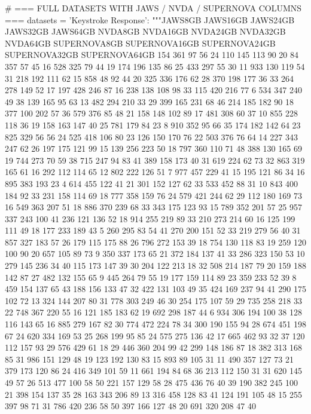 \begin{pyverbatim}
# === FULL DATASETS WITH JAWS / NVDA / SUPERNOVA COLUMNS ===
datasets = {
    'Keystroke Response': """JAWS8GB	JAWS16GB	JAWS24GB	JAWS32GB	JAWS64GB	NVDA8GB	NVDA16GB	NVDA24GB	NVDA32GB	NVDA64GB	SUPERNOVA8GB	SUPERNOVA16GB	SUPERNOVA24GB	SUPERNOVA32GB	SUPERNOVA64GB
154	361	97	56	24	110	145	113	90	20	84	357	57	45	16
528	325	79	44	19	174	196	135	86	25	433	297	55	30	11
933	130	119	54	31	218	192	111	62	15	858	48	92	44	20
325	336	176	62	28	370	198	177	36	33	264	278	149	52	17
197	428	246	87	16	238	138	108	98	33	115	420	216	77	6
534	347	240	49	38	139	165	95	63	13	482	294	210	33	29
399	165	231	68	46	214	185	182	90	18	377	100	202	57	36
579	376	85	48	21	158	148	102	89	17	481	308	60	37	10
855	228	118	36	19	158	163	147	40	25	781	179	84	23	8
910	352	95	66	35	174	182	142	64	23	825	329	56	56	24
525	418	106	80	23	126	150	170	76	22	503	376	76	64	14
227	343	247	62	26	197	175	121	99	15	139	256	223	50	18
797	360	110	71	48	388	130	165	69	19	744	273	70	59	38
715	247	94	83	41	389	158	173	40	31	619	224	62	73	32
863	319	165	61	16	292	112	114	65	12	802	222	126	51	7
977	457	229	41	15	195	121	86	34	16	895	383	193	23	4
614	455	122	41	21	301	152	127	62	33	533	452	88	31	10
843	400	184	92	33	231	158	114	69	18	777	358	159	76	24
579	421	244	62	29	112	180	169	73	16	549	363	207	51	18
886	370	239	68	33	343	175	123	93	15	789	352	201	57	25
957	337	243	100	41	236	121	136	52	18	914	255	219	89	33
210	273	214	60	16	125	199	111	49	18	177	233	189	43	5
260	295	83	54	41	270	200	151	52	33	219	279	56	40	31
857	327	183	57	26	179	115	175	88	26	796	272	153	39	18
754	130	118	83	19	259	120	100	90	20	657	105	89	73	9
350	337	173	65	21	372	184	137	41	33	286	323	150	53	10
279	145	236	34	40	115	173	147	39	30	204	122	213	18	32
508	214	187	79	20	159	188	142	87	27	482	132	155	65	9
445	264	79	55	19	177	159	114	89	23	359	233	52	39	8
459	154	137	65	43	188	156	133	47	32	422	131	103	49	35
424	169	237	94	41	290	175	102	72	13	324	144	207	80	31
778	303	249	46	30	254	175	107	59	29	735	258	218	33	22
748	367	220	55	16	121	185	183	62	19	692	298	187	44	6
934	306	194	100	38	128	116	143	65	16	885	279	167	82	30
774	472	224	78	34	300	190	155	94	28	674	451	198	67	24
620	334	169	53	25	268	199	95	85	24	575	275	136	42	17
665	462	93	32	37	120	112	157	93	29	576	429	61	18	29
446	360	204	99	42	299	148	186	87	18	382	313	168	85	31
986	151	129	48	19	123	192	130	83	15	893	89	105	31	11
490	357	127	73	21	379	173	120	86	24	416	349	101	59	11
661	194	84	68	36	213	112	150	31	31	620	145	49	57	26
513	477	100	58	50	221	157	129	58	28	475	436	76	40	39
190	382	245	100	21	398	154	137	35	28	163	343	206	89	13
316	458	128	83	41	124	191	105	48	15	255	397	98	71	31
786	420	236	58	50	397	166	127	48	20	691	320	208	47	40
}
\end{pyverbatim}
